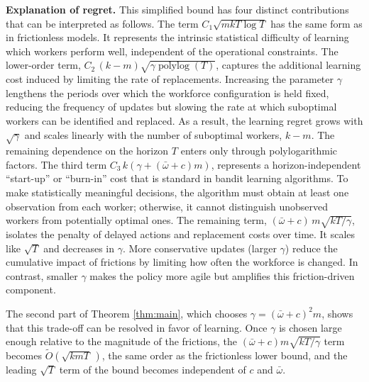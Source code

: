 \documentclass[opre,blindrev]{informs3}
\newcommand{\polylog}{\operatorname{polylog}}
\begin{document}
{\bf Explanation of regret.} This simplified bound has four distinct contributions that can be interpreted as follows. The term \(C_1 \sqrt{mkT\log T}\) has the same form as in frictionless models. It represents the intrinsic statistical difficulty of learning which workers perform well, independent of the operational constraints. The lower-order term, \(C_2\,(k-m)\sqrt{\gamma \polylog(T)}\), captures the additional learning cost induced by limiting the rate of replacements. Increasing the parameter \(\gamma\) lengthens the periods over which the workforce configuration is held fixed, reducing the frequency of updates but slowing the rate at which suboptimal workers can be identified and replaced. As a result, the learning regret grows with \(\sqrt{\gamma}\) and scales linearly with the number of suboptimal workers, \(k-m\). The remaining dependence on the horizon \(T\) enters only through polylogarithmic factors. The third term \(C_3\,k\left(\gamma + (\bar{\omega}+c)m\right)\), 
represents a horizon-independent ``start-up'' or ``burn-in'' cost that is standard in bandit learning algorithms. To make statistically meaningful decisions, the algorithm must obtain at least one observation from each worker; otherwise, it cannot distinguish unobserved workers from potentially optimal ones. 
The remaining term, \((\bar{\omega}+c)\,m\sqrt{{kT}/{\gamma}}\), isolates the penalty of delayed actions and replacement costs over time. It scales like \(\sqrt{T}\) and decreases in \(\gamma\). More conservative updates (larger \(\gamma\)) reduce the cumulative impact of frictions by limiting how often the workforce is changed. In contrast, smaller \(\gamma\) makes the policy more agile but amplifies this friction-driven component. 

The second part of Theorem \ref{thm:main}, which chooses \(\gamma = (\bar{\omega}+c)^2 m\), shows that this trade-off can be resolved in favor of learning. Once \(\gamma\) is chosen large enough relative to the magnitude of the frictions, the \((\bar{\omega}+c)m\sqrt{kT/\gamma}\) term becomes \(\tilde{O}(\sqrt{kmT}\,)\), the same order as the frictionless lower bound, and the leading \(\sqrt{T}\) term of the bound becomes independent of \(c\) and \(\bar{\omega}\).
\end{document}
